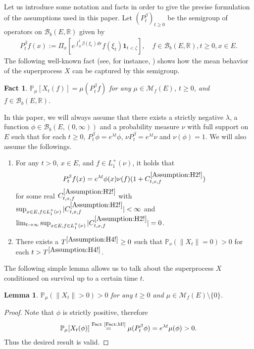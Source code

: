 \documentclass[12pt,a4paper]{amsart}
\numberwithin{equation}{section}
\theoremstyle{plain}
\newtheorem{lem}[thm]{Lemma}
\newtheorem{fact}[thm]{Fact}
\theoremstyle{definition}
\theoremstyle{remark}
\newcounter{N}
\newcounter{n}[N]
\begin{document}
Let us introduce some notation and facts in order to give the precise formulation of the assumptions used in this paper.
Let $(P_t^\beta)_{t\geq 0}$ be the semigroup of operators on $\mathcal B_b(E,\mathbb R)$ given by 
\begin{align}
P_t^\beta f(x)
:= \Pi_x[e^{\int_0^t \beta(\xi_r)dr }f(\xi_t) \mathbf 1_{t < \zeta}], 
\quad f\in \mathcal B_b(E,\mathbb R), t\geq 0, x\in E.
\end{align} 
The following well-known fact (see, for instance, \cite[Proposition 2.27]{Li2011MeasureValued}) shows how the mean behavior of the superprocess $X$ can be captured by this semigroup.
\begin{fact} \label{Fact:M!} 
$
\mathbb P_\mu[X_t(f)] 
= \mu (P_t^\beta f)
$ for any $\mu \in \mathcal M_f(E)$, $t\geq 0$, and $f \in \mathcal B_b(E,\mathbb R)$.
\end{fact}
In this paper, we will always assume that there exists a strictly negative $\lambda$, a function $\phi \in \mathcal B_b(E,(0,\infty))$ and a probability measure $\nu$ with full support on $E$ such that for each $t\geq 0$, $P_t^\beta \phi = e^{\lambda t}\phi$, $\nu P_t^\beta = e^{\lambda t} \nu$ and $\nu(\phi) = 1$.
We will also assume the followings.
\begin{enumerate}[label =(H\arabic*)]
\item \label{Assumption:H2!} 
	For any $t>0$, $x\in E$, and $f\in L_1^+(\nu)$, it holds that \[P_t^\beta f(x) = e^{\lambda t} \phi(x) \nu(f) (1+ C^{\ref{Assumption:H2!}}_{t,x,f})\] for some real $C^{\ref{Assumption:H2!}}_{t,x,f}$ with $ \sup_{x\in E, f\in L_1^+(\nu)} |C^{\ref{Assumption:H2!}}_{t,x,f}| < \infty $ and $\lim_{t\to \infty} \sup_{x\in E, f\in L_1^+(\nu)} |C^{\ref{Assumption:H2!}}_{t,x,f}| = 0$.
\item \label{Assumption:H4!}
	There exists a $T^{\ref{Assumption:H4!}}\geq 0$ such that $\mathbb P_\nu(\|X_t\| = 0)>0$ for each $t> T^{\ref{Assumption:H4!}}$.
\end{enumerate}

	The following simple lemma allows us to talk about the superprocess $X$ conditioned on survival up to a certain time $t$. 
\begin{lem} \label{Lemma:Nd!} 
	$\mathbb P_\mu(\|X_t\| > 0) > 0$ for any $t\geq 0$ and $\mu \in \mathcal M_f(E)\setminus \{0\}$.
\end{lem}
\begin{proof}
	Note that $\phi$ is strictly positive, therefore
\begin{align}
	\mathbb P_\mu[X_t(\phi)] 
	\overset{\text{Fact \ref{Fact:M!}}}= \mu(P_t^\beta \phi) 
	=e^{\lambda t}\mu(\phi)>0.
\end{align}
	Thus the desired result is valid.
\end{proof}
\end{document}
